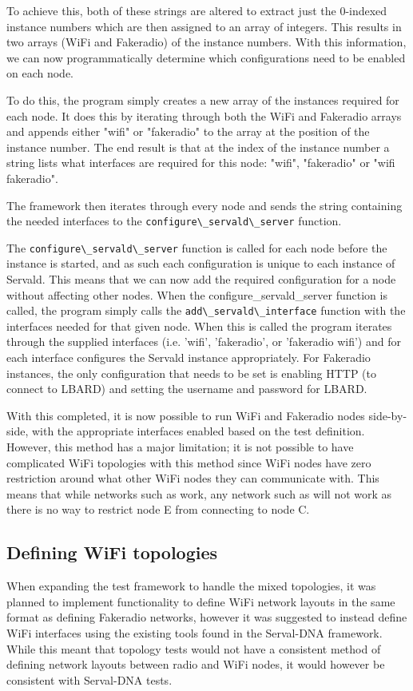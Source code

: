To achieve this, both of these strings are altered to extract just the 0-indexed instance numbers which are then assigned to an array of integers.
This results in two arrays (WiFi and Fakeradio) of the instance numbers.
With this information, we can now programmatically determine which configurations need to be enabled on each node.

To do this, the program simply creates a new array of the instances required for each node.
It does this by iterating through both the WiFi and Fakeradio arrays and appends either "wifi" or "fakeradio" to the array at the position of the instance number.
The end result is that at the index of the instance number a string lists what interfaces are required for this node: "wifi", "fakeradio" or "wifi fakeradio".

The framework then iterates through every node and sends the string containing the needed interfaces to the \verb|configure\_servald\_server| function.


The \verb|configure\_servald\_server| function is called for each node before the instance is started, and as such each configuration is unique to each instance of Servald.
This means that we can now add the required configuration for a node without affecting other nodes.
When the configure\_servald\_server function is called, the program simply calls the \verb|add\_servald\_interface| function with the interfaces needed for that given node.
When this is called the program iterates through the supplied interfaces (i.e. 'wifi', 'fakeradio', or 'fakeradio wifi') and for each interface configures the Servald instance appropriately.
For Fakeradio instances, the only configuration that needs to be set is enabling HTTP (to connect to LBARD) and setting the username and password for LBARD.

With this completed, it is now possible to run WiFi and Fakeradio nodes side-by-side, with the appropriate interfaces enabled based on the test definition.
However, this method has a major limitation; it is not possible to have complicated WiFi topologies with this method since WiFi nodes have zero restriction around what other WiFi nodes they can communicate with.
This means that while networks such as  work, any network such as  will not work as there is no way to restrict node E from connecting to node C.



\subsection{Defining WiFi topologies}
When expanding the test framework to handle the mixed topologies, it was planned to implement functionality to define WiFi network layouts in the same format as defining Fakeradio networks, however it was suggested to instead define WiFi interfaces using the existing tools found in the Serval-DNA framework.
While this meant that topology tests would not have a consistent method of defining network layouts between radio and WiFi nodes, it would however be consistent with Serval-DNA tests.

